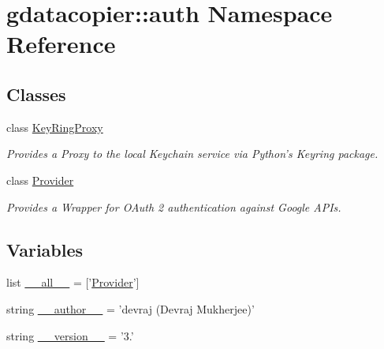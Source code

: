 \hypertarget{namespacegdatacopier_1_1auth}{\section{gdatacopier\-:\-:auth \-Namespace \-Reference}
\label{namespacegdatacopier_1_1auth}
}
\subsection*{\-Classes}
\begin{DoxyCompactItemize}
\item 
class \hyperlink{classgdatacopier_1_1auth_1_1_key_ring_proxy}{\-Key\-Ring\-Proxy}
\begin{DoxyCompactList}\small\item\em \-Provides a \-Proxy to the local \-Keychain service via \-Python's \-Keyring package. \end{DoxyCompactList}\item 
class \hyperlink{classgdatacopier_1_1auth_1_1_provider}{\-Provider}
\begin{DoxyCompactList}\small\item\em \-Provides a \-Wrapper for \-O\-Auth 2 authentication against \-Google \-A\-P\-Is. \end{DoxyCompactList}\end{DoxyCompactItemize}
\subsection*{\-Variables}
\begin{DoxyCompactItemize}
\item 
list \hyperlink{namespacegdatacopier_1_1auth_a842b1f57e92169f65eb0825215da4f67}{\-\_\-\-\_\-all\-\_\-\-\_\-} = \mbox{[}'\hyperlink{classgdatacopier_1_1auth_1_1_provider}{\-Provider}'\mbox{]}
\item 
string \hyperlink{namespacegdatacopier_1_1auth_a9086c0d0063461d414309638f94f9b59}{\-\_\-\-\_\-author\-\_\-\-\_\-} = 'devraj (\-Devraj \-Mukherjee)'
\item 
string \hyperlink{namespacegdatacopier_1_1auth_a113ca92de81467af4472f44c1faf7506}{\-\_\-\-\_\-version\-\_\-\-\_\-} = '3.'
\end{DoxyCompactItemize}


